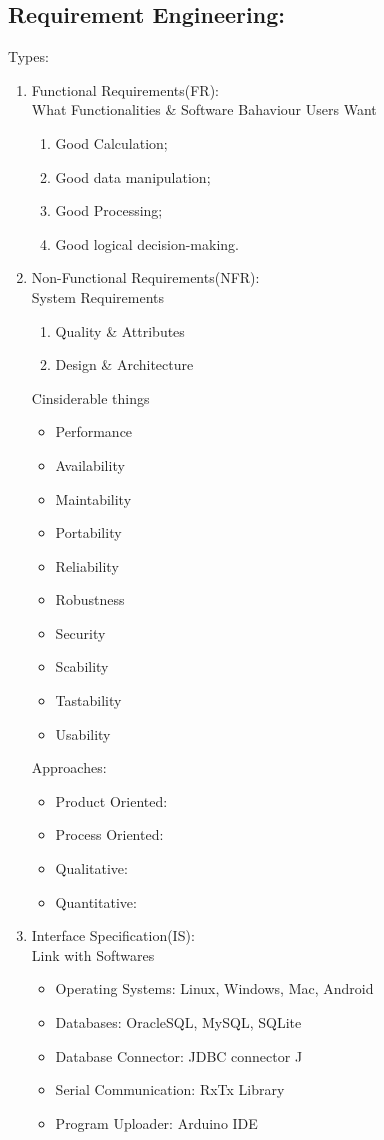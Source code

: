\documentclass{article}
\begin{document}
		\subsection{Requirement Engineering:}
		Types:
		\begin{enumerate}
			\item Functional Requirements(FR):
			\\What Functionalities \& Software Bahaviour Users Want
			\begin{enumerate}
				\item Good Calculation; \item Good data manipulation; \item Good Processing; \item Good logical decision-making.
			\end{enumerate}
			\item Non-Functional Requirements(NFR):
			\\System Requirements
			\begin{enumerate}
				\item Quality \& Attributes \item Design \& Architecture
			\end{enumerate}
			Cinsiderable things
			\begin{itemize}
				\item Performance \item Availability \item Maintability \item Portability \item Reliability \item Robustness \item Security \item Scability \item Tastability \item Usability
			\end{itemize}
			Approaches:
			\begin{itemize}
				\item Product Oriented: \item Process Oriented: \item Qualitative: \item Quantitative:
			\end{itemize}
			\item Interface Specification(IS):
			\\Link with Softwares
			\begin{itemize}
				\item Operating Systems: Linux, Windows, Mac, Android \item Databases: OracleSQL, MySQL, SQLite \item Database Connector: JDBC connector J \item Serial Communication: RxTx Library \item Program Uploader: Arduino IDE

\end{itemize}
\end{enumerate}
\end{document}
